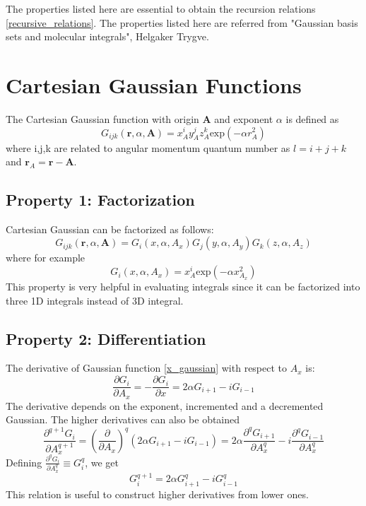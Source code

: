 The properties listed here are essential to obtain the recursion relations \eqref{recursive_relations}. The properties listed here are referred from "Gaussian basis sets and molecular integrals", Helgaker Trygve\cite{helgaker}. 
\section{Cartesian Gaussian Functions}\label{appendix_prop}
The Cartesian Gaussian function with origin $\mathbf{A}$ and exponent $\alpha$ is defined as 
\begin{equation}
    G_{ijk}(\mathbf{r},\alpha,\mathbf{A}) = x_A^iy_A^jz_A^k\text{exp}(-\alpha r^2_A)
\end{equation}
where i,j,k are related to angular momentum quantum number as $l = i+j+k$ and $\mathbf{r}_A = \mathbf{r} - \mathbf{A}$. 
\subsection*{Property 1: Factorization}
Cartesian Gaussian can be factorized as follows:
\begin{equation}
    G_{ijk}(\mathbf{r},\alpha,\mathbf{A}) = G_i(x,\alpha,A_x)G_j(y,\alpha,A_y)G_k(z,\alpha,A_z)
\end{equation}
where for example
\begin{equation}\label{x_gaussian}
    G_i(x,\alpha,A_x) = x^i_A\text{exp}(-\alpha x^2_{A_x})
\end{equation}
This property is very helpful in evaluating integrals since it can be factorized into three 1D integrals instead of 3D integral. 
\subsection*{Property 2: Differentiation}
The derivative of Gaussian function \eqref{x_gaussian} with respect to $A_x$ is:
\begin{equation}
    \frac{\partial G_i}{\partial A_x} = -\frac{\partial G_i}{\partial x} = 2\alpha G_{i+1} - iG_{i-1} 
\end{equation}
The derivative depends on the exponent, incremented and a decremented Gaussian. The higher derivatives can also be obtained
\begin{equation}
    \frac{\partial^{q+1} G_i}{\partial A_x^{q+1}} = \left(\frac{\partial}{\partial A_x}\right)^q(2\alpha G_{i+1} - iG_{i-1}) = 2\alpha \frac{\partial^{q} G_{i+1}}{\partial A_x^{q}} - i\frac{\partial^{q} G_{i-1}}{\partial A_x^{q}}
\end{equation}
Defining $\frac{\partial^{q} G_i}{\partial A_x^{q}} \equiv G^q_i$, we get
\begin{equation}
    G_i^{q+1} = 2\alpha G^q_{i+1} - iG^q_{i-1}
\end{equation}
This relation is useful to construct higher derivatives from lower ones.
